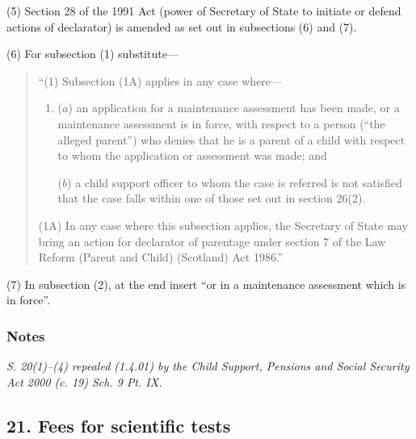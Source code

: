 \documentclass[a4paper]{article}
\newcommand\amendment[1]{\subsubsection*{Notes}{\itshape\frenchspacing\footnotesize #1 \par}}
\begin{document}
(5) Section 28 of the 1991 Act (power of Secretary of State to initiate or defend actions of declarator) is amended as set out in subsections (6) and (7).

(6) For subsection (1) substitute—
\begin{quotation}
“(1) Subsection (1A) applies in any case where—
\begin{enumerate}\item[]
($a$) an application for a maintenance assessment has been made, or a maintenance assessment is in force, with respect to a person (“the alleged parent”) who denies that he is a parent of a child with respect to whom the application or assessment was made; and

($b$) a child support officer to whom the case is referred is not satisfied that the case falls within one of those set out in section 26(2).
\end{enumerate}

(1A) In any case where this subsection applies, the Secretary of State may bring an action for declarator of parentage under section 7 of the Law Reform (Parent and Child) (Scotland) Act 1986.”
\end{quotation}

(7) In subsection (2), at the end insert “or in a maintenance assessment which is in force”.

\amendment{
S. 20(1)--(4) repealed (1.4.01) by the Child Support, Pensions and Social Security Act 2000 (c. 19) Sch. 9 Pt. IX.
}

\subsection{21. Fees for scientific tests}
\end{document}
